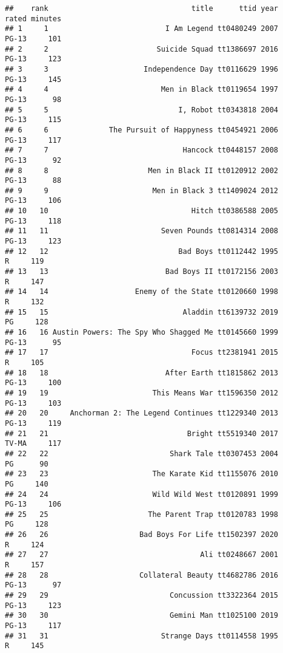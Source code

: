 \documentclass[
]{article}
\newenvironment{Shaded}{\begin{snugshade}}{\end{snugshade}}
\begin{document}
\begin{Shaded}
\begin{Highlighting}[]
\begin{verbatim}
##    rank                                 title      ttid year     rated minutes
## 1     1                           I Am Legend tt0480249 2007     PG-13     101
## 2     2                         Suicide Squad tt1386697 2016     PG-13     123
## 3     3                      Independence Day tt0116629 1996     PG-13     145
## 4     4                          Men in Black tt0119654 1997     PG-13      98
## 5     5                              I, Robot tt0343818 2004     PG-13     115
## 6     6              The Pursuit of Happyness tt0454921 2006     PG-13     117
## 7     7                               Hancock tt0448157 2008     PG-13      92
## 8     8                       Men in Black II tt0120912 2002     PG-13      88
## 9     9                        Men in Black 3 tt1409024 2012     PG-13     106
## 10   10                                 Hitch tt0386588 2005     PG-13     118
## 11   11                          Seven Pounds tt0814314 2008     PG-13     123
## 12   12                              Bad Boys tt0112442 1995         R     119
## 13   13                           Bad Boys II tt0172156 2003         R     147
## 14   14                    Enemy of the State tt0120660 1998         R     132
## 15   15                               Aladdin tt6139732 2019        PG     128
## 16   16 Austin Powers: The Spy Who Shagged Me tt0145660 1999     PG-13      95
## 17   17                                 Focus tt2381941 2015         R     105
## 18   18                           After Earth tt1815862 2013     PG-13     100
## 19   19                        This Means War tt1596350 2012     PG-13     103
## 20   20     Anchorman 2: The Legend Continues tt1229340 2013     PG-13     119
## 21   21                                Bright tt5519340 2017     TV-MA     117
## 22   22                            Shark Tale tt0307453 2004        PG      90
## 23   23                        The Karate Kid tt1155076 2010        PG     140
## 24   24                        Wild Wild West tt0120891 1999     PG-13     106
## 25   25                       The Parent Trap tt0120783 1998        PG     128
## 26   26                     Bad Boys For Life tt1502397 2020         R     124
## 27   27                                   Ali tt0248667 2001         R     157
## 28   28                     Collateral Beauty tt4682786 2016     PG-13      97
## 29   29                            Concussion tt3322364 2015     PG-13     123
## 30   30                            Gemini Man tt1025100 2019     PG-13     117
## 31   31                          Strange Days tt0114558 1995         R     145

\end{verbatim}
\end{Highlighting}
\end{Shaded}
\end{document}

